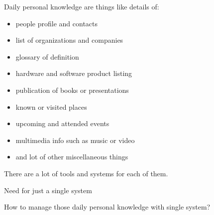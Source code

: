 \documentclass[10pt, compress]{beamer}
\begin{document}
\begin{frame}[fragile]

  \begin{center}
  \alert{Daily personal knowledge} are things like details of:
  \begin{itemize} \itemsep0pt
    \item people profile and contacts
    \item list of organizations and companies
    \item glossary of definition
    \item hardware and software product listing
    \item publication of books or presentations
    \item known or visited places
    \item upcoming and attended events
    \item multimedia info such as music or video
    \item and lot of other miscellaneous things
  \end{itemize}

  \end{center}

\end{frame}


\begin{frame}[fragile]

  \begin{center}
    There are a lot of tools and systems for each of them.

    \alert{Need for just a single system}
  \end{center}

\end{frame}


\begin{frame}[fragile]

  \begin{center}
  How to manage those \alert{daily personal knowledge} with single system?
  \end{center}

\end{frame}
\end{document}

